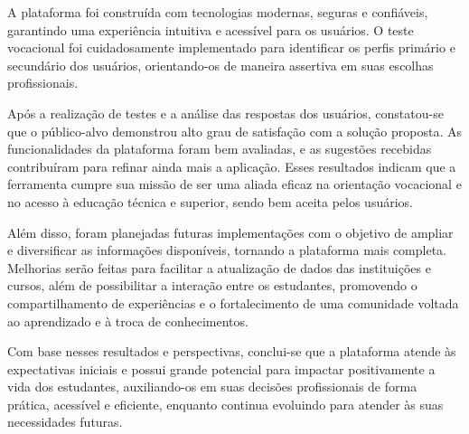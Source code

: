 A plataforma foi construída com tecnologias modernas, seguras e confiáveis, garantindo uma experiência intuitiva e acessível para os usuários. O teste vocacional foi cuidadosamente implementado para identificar os perfis primário e secundário dos usuários, orientando-os de maneira assertiva em suas escolhas profissionais.

Após a realização de testes e a análise das respostas dos usuários, constatou-se que o público-alvo demonstrou alto grau de satisfação com a solução proposta. As funcionalidades da plataforma foram bem avaliadas, e as sugestões recebidas contribuíram para refinar ainda mais a aplicação. Esses resultados indicam que a ferramenta cumpre sua missão de ser uma aliada eficaz na orientação vocacional e no acesso à educação técnica e superior, sendo bem aceita pelos usuários.

Além disso, foram planejadas futuras implementações com o objetivo de ampliar e diversificar as informações disponíveis, tornando a plataforma mais completa. Melhorias serão feitas para facilitar a atualização de dados das instituições e cursos, além de possibilitar a interação entre os estudantes, promovendo o compartilhamento de experiências e o fortalecimento de uma comunidade voltada ao aprendizado e à troca de conhecimentos.

Com base nesses resultados e perspectivas, conclui-se que a plataforma atende às expectativas iniciais e possui grande potencial para impactar positivamente a vida dos estudantes, auxiliando-os em suas decisões profissionais de forma prática, acessível e eficiente, enquanto continua evoluindo para atender às suas necessidades futuras.
























